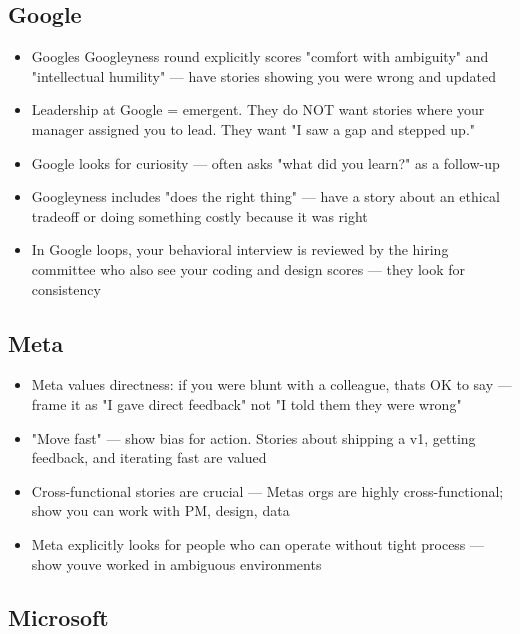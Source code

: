 \documentclass[11pt]{article}
\providecommand{\tightlist}{\setlength{\itemsep}{1pt}\setlength{\parskip}{0pt}}
\begin{document}
\subsection{Google}\label{google}

\begin{itemize}
\tightlist
\item
  Google\textquotesingle s Googleyness round explicitly scores "comfort with ambiguity" and "intellectual humility" --- have stories showing you were wrong and updated
\item
  Leadership at Google = emergent. They do NOT want stories where your manager assigned you to lead. They want "I saw a gap and stepped up."
\item
  Google looks for curiosity --- often asks "what did you learn?" as a follow-up
\item
  Googleyness includes "does the right thing" --- have a story about an ethical tradeoff or doing something costly because it was right
\item
  In Google loops, your behavioral interview is reviewed by the hiring committee who also see your coding and design scores --- they look for consistency
\end{itemize}

\subsection{Meta}\label{meta}

\begin{itemize}
\tightlist
\item
  Meta values directness: if you were blunt with a colleague, that\textquotesingle s OK to say --- frame it as "I gave direct feedback" not "I told them they were wrong"
\item
  "Move fast" --- show bias for action. Stories about shipping a v1, getting feedback, and iterating fast are valued
\item
  Cross-functional stories are crucial --- Meta\textquotesingle s orgs are highly cross-functional; show you can work with PM, design, data
\item
  Meta explicitly looks for people who can operate without tight process --- show you\textquotesingle ve worked in ambiguous environments
\end{itemize}

\subsection{Microsoft}\label{microsoft}
\end{document}
